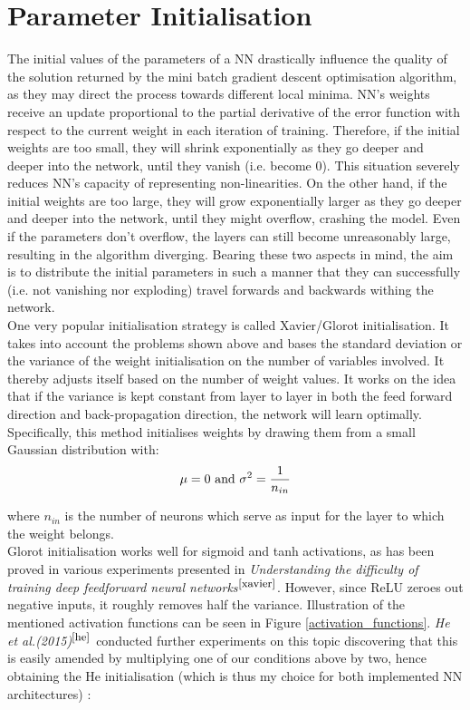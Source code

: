  
 \section{Parameter Initialisation}

The initial values of the parameters of a NN drastically influence the quality of the solution returned by the mini batch gradient descent optimisation algorithm, as they may direct the process towards different local minima. NN's weights receive an update proportional to the partial derivative of the error function with respect to the current weight in each iteration of training. Therefore, if the initial weights are too small, they will shrink exponentially as they go deeper and deeper into the network, until they vanish (i.e. become 0). This situation severely reduces NN's capacity of representing non-linearities. On the other hand, if the initial weights are too large, they will grow exponentially larger as they go deeper and deeper into the network, until they might overflow, crashing the model. Even if the parameters don't overflow, the layers can still become unreasonably large, resulting in the algorithm diverging. Bearing these two aspects in mind, the aim is to distribute the initial parameters in such a manner that they can successfully (i.e. not vanishing nor exploding) travel forwards and backwards withing the network. \\

One very popular initialisation strategy is called Xavier/Glorot initialisation. It takes into account the problems shown above and bases the standard deviation or the variance of the weight initialisation on the number of variables involved. It thereby adjusts itself based on the number of weight values. It works on the idea that if the variance is kept constant from layer to layer in both the feed forward direction and back-propagation direction, the network will learn optimally. Specifically, this method initialises weights by drawing them from a small Gaussian distribution with: \\

\begin{equation}
  \centering
  \mu = 0 \ \text{and} \ \sigma^2 = \frac{1}{n_{in}}
\end{equation}

where $n_{in}$ is the number of neurons which serve as input for the layer to which the weight belongs. \\

Glorot initialisation works well for sigmoid and tanh activations, as has been proved in various experiments presented in \textit{Understanding the difficulty of training deep feedforward neural networks}$^{\small \cite{xavier}}$. However, since ReLU zeroes out negative inputs, it roughly removes half the variance. Illustration of the mentioned activation functions can be seen in Figure \ref{activation_functions}. \textit{He et al.(2015)}$^{\small \cite{he}}$ conducted further experiments on this topic discovering that this is easily amended by multiplying one of our conditions above by two, hence obtaining the He initialisation (which is thus my choice for both implemented NN architectures) :

